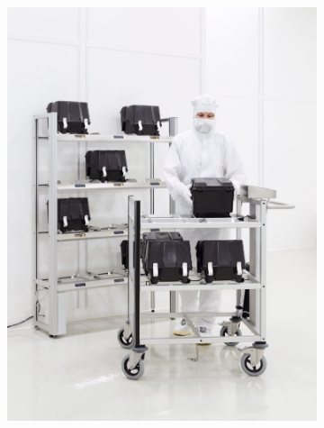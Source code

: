 \begin{figure}[!ht]
    \centering
    \begin{subfigure}{.45\textwidth}
        \centering
        \includegraphics[width=\linewidth]{./figs/02-state-of-the-art/fabmaticsrfidrack2.jpg}
    \end{subfigure}
    \begin{subfigure}{.45\textwidth}
        \centering

\end{subfigure}
\end{figure}
